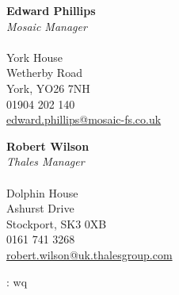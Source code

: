 \documentclass[11pt, a4paper]{cv}
\begin{document}
\begin{minipage}[t]{0.8\textwidth}
\begin{minipage}[t]{0.49\textwidth}
\textbf{Edward Phillips} \\
\textit{Mosaic Manager} \\
\\
York House \\
Wetherby Road \\
York, 
YO26 7NH \\
01904 202 140 \\
\href{mailto:edward.phillips@mosaic-fs.co.uk}{edward.phillips@mosaic-fs.co.uk}
\end{minipage}
\begin{minipage}[t]{0.49\textwidth}
\textbf{Robert Wilson} \\
\textit{Thales Manager} \\
\\
Dolphin House \\
Ashurst Drive \\
Stockport, 
SK3 0XB \\
0161 741 3268 \\
\href{mailto:robert.wilson@uk.thalesgroup.com}{robert.wilson@uk.thalesgroup.com}
\end{minipage}

\end{minipage}

\vfill

{}
\scriptsize\flushright: wq
\end{document}

